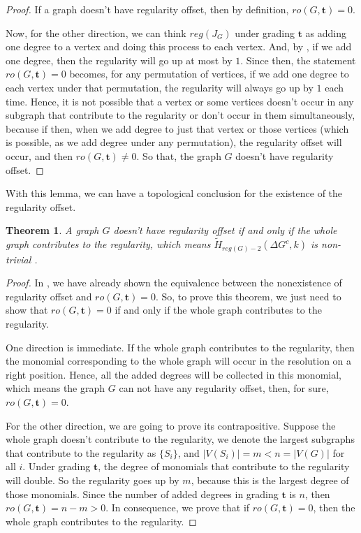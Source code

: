\documentclass[dvipsnames,10pt]{article}
\newtheorem{theorem}{Theorem}[section]
\begin{document}
\begin{proof}
    If a graph doesn't have regularity offset, then by definition, $ro(G,\mathbf{t})=0$.

    Now, for the other direction, we can think $reg(J_G)$ under grading $\mathbf{t}$ as adding one degree to a vertex and doing this process to each vertex. And, by , if we add one degree, then the regularity will go up at most by $1$. Since then, the statement $ro(G,\mathbf{t})=0$ becomes, for any permutation of vertices, if we add one degree to each vertex under that permutation, the regularity will always go up by $1$ each time. Hence, it is not possible that a vertex or some vertices doesn't occur in any subgraph that contribute to the regularity or don't occur in them simultaneously, because if then, when we add degree to just that vertex or those vertices (which is possible, as we add degree under any permutation), the regularity offset will occur, and then $ro(G,\mathbf{t})\neq0$. So that, the graph $G$ doesn't have regularity offset. 
\end{proof}

With this lemma, we can have a topological conclusion for the existence of the regularity offset.

\begin{theorem}
    A graph $G$ doesn't have regularity offset if and only if the whole graph contributes to the regularity, which means $\widetilde{H}_{reg(G)-2}\left(\Delta G^c, k\right)$ is non-trivial .
\end{theorem}

\begin{proof}
    In , we have already shown the equivalence between the nonexistence of regularity offset and $ro(G,\mathbf{t})=0$. So, to prove this theorem, we just need to show that $ro(G,\mathbf{t})=0$ if and only if the whole graph contributes to the regularity.

    One direction is immediate. If the whole graph contributes to the regularity, then the monomial corresponding to the whole graph will occur in the resolution on a right position. Hence, all the added degrees will be collected in this monomial, which means the graph $G$ can not have any regularity offset, then, for sure, $ro(G,\mathbf{t})=0$.

    For the other direction, we are going to prove its contrapositive. Suppose the whole graph doesn't contribute to the regularity, we denote the largest subgraphs that contribute to the regularity as $\{S_i\}$, and $|V(S_i)|=m<n=|V(G)|$ for all $i$. Under grading $\mathbf{t}$, the degree of monomials that contribute to the regularity will double. So the regularity goes up by $m$, because this is the largest degree of those monomials. Since the number of added degrees in grading $\mathbf{t}$ is $n$, then $ro(G,\mathbf{t})=n-m>0$. In consequence, we prove that if $ro(G,\mathbf{t})=0$, then the whole graph contributes to the regularity.

    
\end{proof}
\end{document}
